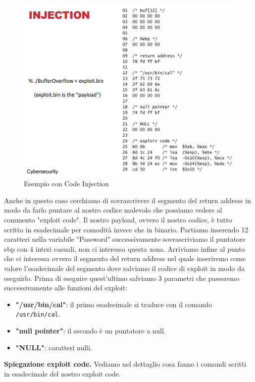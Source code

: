 \begin{figure}[H]
    \centering
    \includegraphics[width=12cm, keepaspectratio]{capitoli/secure_coding/img/cap_2/es_pass_ok_code_inj.png}
    \caption{Esempio con Code Injection}\label{fig:es_pass_ok_code_inj}
\end{figure}

Anche in questo caso cerchiamo di sovrascrivere il segmento del return address in modo
da farlo puntare al nostro codice malevolo che possiamo vedere al commento "exploit code".
Il nostro payload, ovvero il nostro codice, è tutto scritto in esadecimale per comodità
invece che in binario. Partiamo inserendo 12 caratteri nella variabile "Password"
successivamente sovrascriviamo il puntatore ebp con 4 interi casuali, non ci interessa
questa zona. Arriviamo infine al punto che ci interessa ovvero il segmento del return
address nel quale inseriremo come valore l'esadecimale del segmento dove salviamo
il codice di exploit in modo da eseguirlo. Prima di eseguire quest'ultimo salviamo 3
parametri che passeremo successivamente alle funzioni del exploit:

\begin{itemize}
    \item \textbf{"/usr/bin/cal"}: il primo esadecimale si traduce con il
          comando \verb|/usr/bin/cal|.
    \item \textbf{"null pointer"}: il secondo è un puntatore a null.
    \item \textbf{"NULL"}: caratteri nulli.
\end{itemize}

\textbf{Spiegazione exploit code.} Vediamo nel dettaglio cosa fanno i comandi scritti
in esadecimale del nostro exploit code.

